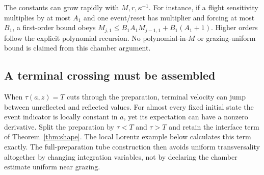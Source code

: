 The constants can grow rapidly with $M,r,\kappa^{-1}$. For instance, if a flight sensitivity multiplies by at most $A_1$ and one event/reset has multiplier and forcing at most $B_1$, a first-order bound obeys
$M_{j,1}\le B_1A_1M_{j-1,1}+B_1(A_1+1)$.
Higher orders follow the explicit polynomial recursion. No polynomial-in-$M$ or grazing-uniform bound is claimed from this chamber argument.

\subsection{A terminal crossing must be assembled}
When $\tau(a,z)=T$ cuts through the preparation, terminal velocity can jump between unreflected and reflected values. For almost every fixed initial state the event indicator is locally constant in $a$, yet its expectation can have a nonzero derivative. Split the preparation by $\tau<T$ and $\tau>T$ and retain the interface term of Theorem~\ref{thm:shape}. The local Lorentz example below calculates this term exactly. The full-preparation tube construction then avoids uniform transversality altogether by changing integration variables, not by declaring the chamber estimate uniform near grazing.
\par
